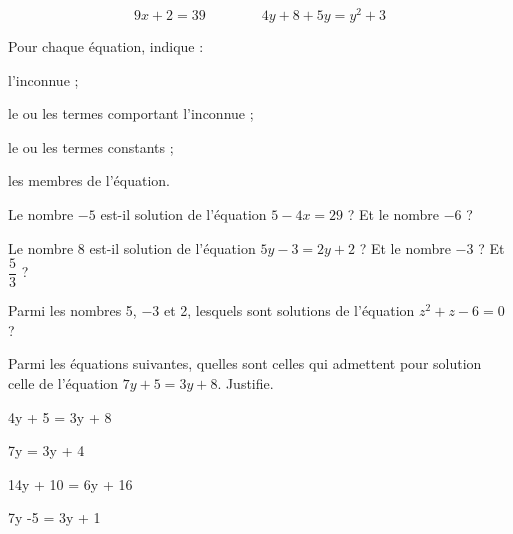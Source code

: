 

\begin{exercice}[Vocabulaire]

\[ 9x + 2 = 39  \qquad \qquad 4y + 8 + 5y = y^2 + 3 \]

Pour chaque équation, indique : 
\begin{colenumerate}{1} 
\item l'inconnue ;
\item le ou les termes comportant l'inconnue ;
\item le ou les termes constants ;
\item les membres de l'équation.
\end{colenumerate} 
\end{exercice}




\begin{exercice}

\begin{colenumerate}{1} 
\item Le nombre $-5$ est-il solution de l'équation $5 -4x = 29$ ? Et le nombre $-6$ ?
\item Le nombre 8 est-il solution de l'équation $5y -3 = 2y + 2$ ? Et le nombre $-3$ ? Et $\dfrac{5}{3}$ ?
\item Parmi les nombres 5, $-3$ et 2, lesquels sont solutions de l'équation $z^2 + z -6 = 0$ ?
\end{colenumerate} 
\end{exercice}



\begin{exercice}[]
Parmi les équations suivantes, quelles sont celles qui admettent pour solution celle de l'équation $7y + 5 = 3y + 8$. Justifie.

\begin{colenumerate}{2} 
\item 4y + 5 = 3y + 8
\item 7y = 3y + 4
\item 14y + 10 = 6y + 16
\item 7y -5 = 3y + 1
\end{colenumerate} 
\end{exercice}





